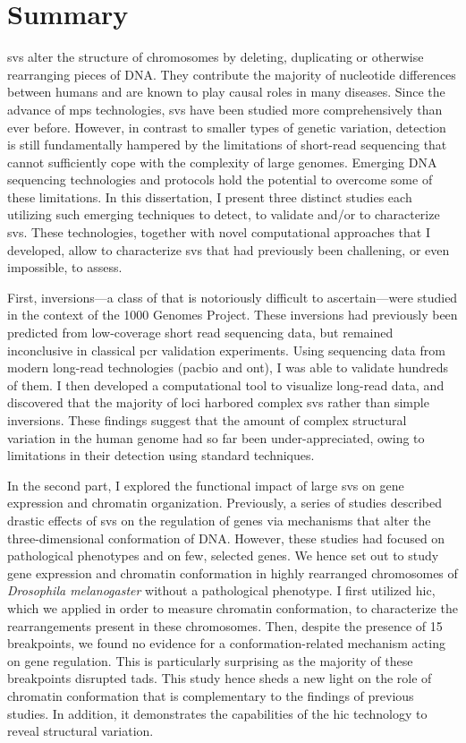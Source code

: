 \cleardoublepage
{}
\chapter*{Summary}

\Acfp{sv} alter the structure of chromosomes by deleting, duplicating or
otherwise rearranging pieces of DNA. They contribute the majority of nucleotide
differences between humans and are known to play causal roles in many diseases.
Since the advance of \acf{mps} technologies, \acp{sv} have been
studied more comprehensively than ever before. However, in contrast to smaller
types of genetic variation, \sv detection is still fundamentally hampered by
the limitations of short-read sequencing that cannot sufficiently cope with the
complexity of large genomes. Emerging DNA sequencing technologies and protocols
hold the potential to overcome some of these limitations. In this dissertation,
I present three distinct studies each utilizing such emerging techniques to
detect, to validate and/or to characterize \acp{sv}. These
technologies, together with novel computational approaches that I developed, allow
to characterize \acp{sv} that had previously been challening, or even
impossible, to assess.

First, inversions---a class of \sv that is notoriously difficult to
ascertain---were studied in the context of the 1000 Genomes Project. These inversions had
previously been predicted from low-coverage short read sequencing data, but
remained inconclusive in classical \acs{pcr} validation experiments. Using sequencing
data from modern long-read technologies (\acl{pacbio} and \acl{ont}),
I was able to validate hundreds of them. I then developed a
computational tool to visualize long-read data, and discovered that the majority
of loci harbored complex \acp{sv} rather than simple inversions. These findings
suggest that the amount of complex structural variation in the human genome had
so far been under-appreciated, owing to limitations in their detection using
standard techniques.

In the second part, I explored the functional impact of large \acp{sv} on gene
expression and chromatin organization. Previously, a series of
studies described drastic effects of \acp{sv} on the regulation of genes
via mechanisms that alter the three-dimensional conformation of DNA. However,
these studies had focused on pathological phenotypes and on few,
selected genes. We hence set out to study
gene expression and chromatin conformation in highly rearranged
chromosomes of \textit{Drosophila melanogaster} without a pathological phenotype.
I first utilized \acs{hic}, which we applied in order to measure chromatin
conformation, to characterize the rearrangements present in these chromosomes.
Then, despite the presence of 15 breakpoints, we found no evidence for a
conformation-related mechanism acting on gene regulation. This is particularly
surprising as the majority of these breakpoints disrupted \aclp{tad}.
This study hence sheds a new light on the role of chromatin
conformation that is complementary to the findings of previous studies.
In addition, it demonstrates the capabilities of the \acs{hic} technology to
reveal structural variation.

